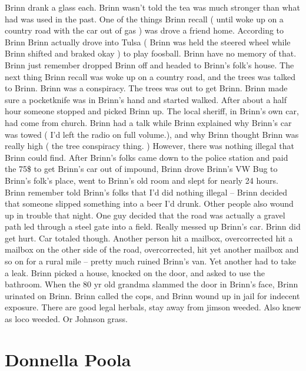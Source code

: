 \documentclass[12pt]{book}
\begin{document}
Brinn drank a glass each. Brinn wasn't told the tea was much stronger than what had was used in the past. One of the things Brinn recall ( until woke up on a country road with the car out of gas ) was drove a friend home. According to Brinn Brinn actually drove into Tulsa ( Brinn was held the steered wheel while Brinn shifted and braked okay ) to play foosball. Brinn have no memory of that. Brinn just remember dropped Brinn off and headed to Brinn's folk's house. The next thing Brinn recall was woke up on a country road, and the trees was talked to Brinn. Brinn was a conspiracy. The trees was out to get Brinn. Brinn made sure a pocketknife was in Brinn's hand and started walked. After about a half hour someone stopped and picked Brinn up. The local sheriff, in Brinn's own car, had come from church. Brinn had a talk while Brinn explained why Brinn's car was towed ( I'd left the radio on full volume.), and why Brinn thought Brinn was really high ( the tree conspiracy thing. ) However, there was nothing illegal that Brinn could find. After Brinn's folks came down to the police station and paid the 75\$ to get Brinn's car out of impound, Brinn drove Brinn's VW Bug to Brinn's folk's place, went to Brinn's old room and slept for nearly 24 hours. Brinn remember told Brinn's folks that I'd did nothing illegal -- Brinn decided that someone slipped something into a beer I'd drunk. Other people also wound up in trouble that night. One guy decided that the road was actually a gravel path led through a steel gate into a field. Really messed up Brinn's car. Brinn did get hurt. Car totaled though. Another person hit a mailbox, overcorrected hit a mailbox on the other side of the road, overcorrected, hit yet another mailbox and so on for a rural mile -- pretty much ruined Brinn's van. Yet another had to take a leak. Brinn picked a house, knocked on the door, and asked to use the bathroom. When the 80 yr old grandma slammed the door in Brinn's face, Brinn urinated on Brinn. Brinn called the cops, and Brinn wound up in jail for indecent exposure. There are good legal herbals, stay away from jimson weeded. Also knew as loco weeded. Or Johnson grass.



\chapter{Donnella Poola}
\end{document}
